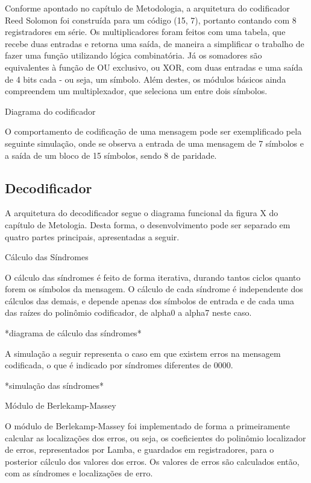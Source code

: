 	Conforme apontado no capítulo de Metodologia, a arquitetura do codificador Reed Solomon foi construída para um código (15, 7), portanto contando com 8 registradores em série. Os multiplicadores foram feitos com uma tabela,  que recebe duas entradas e retorna uma saída, de maneira a simplificar o trabalho de fazer uma função utilizando lógica combinatória. Já os somadores são equivalentes à função de OU exclusivo, ou XOR, com duas entradas e uma saída de 4 bits cada - ou seja, um símbolo. Além destes, os módulos básicos ainda compreendem um multiplexador, que seleciona um entre dois símbolos.
	
	Diagrama do codificador
	
	O comportamento de codificação de uma mensagem pode ser exemplificado pela seguinte simulação, onde se observa a entrada de uma mensagem de 7 símbolos e a saída de um bloco de 15 símbolos, sendo 8 de paridade.
	
	
	\subsection{Decodificador}
	
	A arquitetura do decodificador segue o diagrama funcional da figura X do capítulo de Metologia. Desta forma, o desenvolvimento pode ser separado em quatro partes principais, apresentadas a seguir.
	
	Cálculo das Síndromes
	
	O cálculo das síndromes é feito de forma iterativa, durando tantos ciclos quanto forem os símbolos da mensagem. O cálculo de cada síndrome é independente dos cálculos das demais, e depende apenas dos símbolos de entrada e de cada uma das raízes do polinômio codificador, de alpha0 a alpha7 neste caso.
	
	*diagrama de cálculo das síndromes*
	
	A simulação a seguir representa o caso em que existem erros na mensagem codificada, o que é indicado por síndromes diferentes de 0000.
	
	*simulação das síndromes*
	
	Módulo de Berlekamp-Massey
	
	O módulo de Berlekamp-Massey foi implementado de forma a primeiramente calcular as localizações dos erros, ou seja, os coeficientes do polinômio localizador de erros, representados por Lamba, e guardados em registradores, para o posterior cálculo dos valores dos erros. Os valores de erros são calculados então, com as síndromes e localizações de erro.
	
